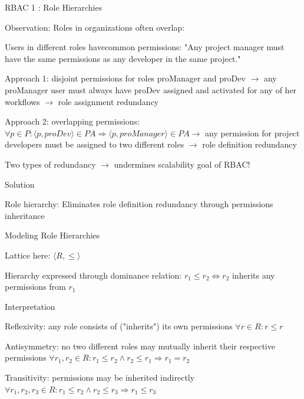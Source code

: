 \documentclass[a4paper]{article}
\begin{document}
\begin{multicols}{3}
    RBAC 1 : Role Hierarchies
    \begin{itemize*}
        \item Observation: Roles in organizations often overlap:
        \begin{itemize*}
            \item Users in different roles havecommon permissions: "Any project manager must have the same permissions as any developer in the same project."
            \item Approach 1: disjoint permissions for roles proManager and proDev $\rightarrow$ any proManager user must always have proDev assigned and activated for any of her workflows $\rightarrow$ role assignment redundancy
            \item Approach 2: overlapping permissions: $\forall p\in P:⟨p,proDev⟩ \in PA\Rightarrow ⟨p,proManager⟩ \in PA\rightarrow$ any permission for project developers must be assigned to two different roles $\rightarrow$ role definition redundancy
            \item Two types of redundancy $\rightarrow$ undermines scalability goal of RBAC!
        \end{itemize*}
        \item Solution
        \begin{itemize*}
            \item Role hierarchy: Eliminates role definition redundancy through permissions inheritance
        \end{itemize*}
        \item Modeling Role Hierarchies
        \begin{itemize*}
            \item Lattice here: $⟨R,\leq⟩$
            \item Hierarchy expressed through dominance relation: $r_1\leq r_2 \Leftrightarrow r_2$ inherits any permissions from $r_1$
            \item Interpretation
            \begin{itemize*}
                \item Reflexivity: any role consists of ("inherits") its own permissions $\forall r\in R:r\leq r$
                \item Antisymmetry: no two different roles may mutually inherit their respective permissions $\forall r_1 ,r_2\in R:r_1\leq r_2\wedge r_2\leq r_1\Rightarrow r_1=r_2$
                \item Transitivity: permissions may be inherited indirectly $\forall r_1,r_2,r_3\in R:r_1\leq r_2 \wedge r_2\leq r_3\Rightarrow r_1\leq r_3$
            \end{itemize*}
        \end{itemize*}
    \end{itemize*}


\end{multicols}
\end{document}
